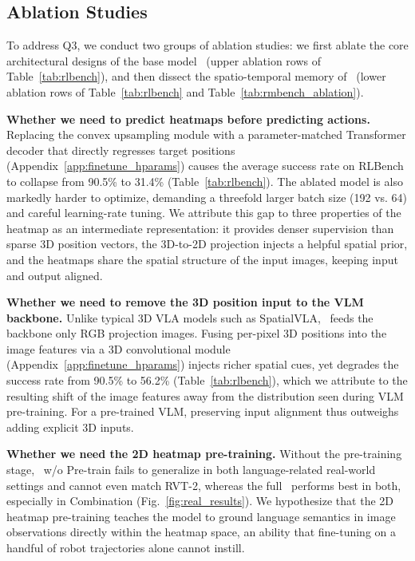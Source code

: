 \subsection{Ablation Studies}
\label{sec:exp:ablation}

To address Q3, we conduct two groups of ablation studies: we first ablate the core architectural designs of the base model \method\ (upper ablation rows of Table~\ref{tab:rlbench}), and then dissect the spatio-temporal memory of \memmethod\ (lower ablation rows of Table~\ref{tab:rlbench} and Table~\ref{tab:rmbench_ablation}).

\textbf{Whether we need to predict heatmaps before predicting actions.}
Replacing the convex upsampling module with a parameter-matched Transformer decoder that directly regresses target positions (Appendix~\ref{app:finetune_hparams}) causes the average success rate on RLBench to collapse from 90.5\% to 31.4\% (Table~\ref{tab:rlbench}).
The ablated model is also markedly harder to optimize, demanding a threefold larger batch size (192 vs. 64) and careful learning-rate tuning.
We attribute this gap to three properties of the heatmap as an intermediate representation: it provides denser supervision than sparse 3D position vectors, the 3D-to-2D projection injects a helpful spatial prior, and the heatmaps share the spatial structure of the input images, keeping input and output aligned.

\textbf{Whether we need to remove the 3D position input to the VLM backbone.}
Unlike typical 3D VLA models such as SpatialVLA, \method\ feeds the backbone only RGB projection images.
Fusing per-pixel 3D positions into the image features via a 3D convolutional module (Appendix~\ref{app:finetune_hparams}) injects richer spatial cues, yet degrades the success rate from 90.5\% to 56.2\% (Table~\ref{tab:rlbench}), which we attribute to the resulting shift of the image features away from the distribution seen during VLM pre-training.
For a pre-trained VLM, preserving input alignment thus outweighs adding explicit 3D inputs.

\textbf{Whether we need the 2D heatmap pre-training.}
Without the pre-training stage, \method\ w/o Pre-train fails to generalize in both language-related real-world settings and cannot even match RVT-2, whereas the full \method\ performs best in both, especially in Combination (Fig.~\ref{fig:real_results}).
We hypothesize that the 2D heatmap pre-training teaches the model to ground language semantics in image observations directly within the heatmap space, an ability that fine-tuning on a handful of robot trajectories alone cannot instill.

